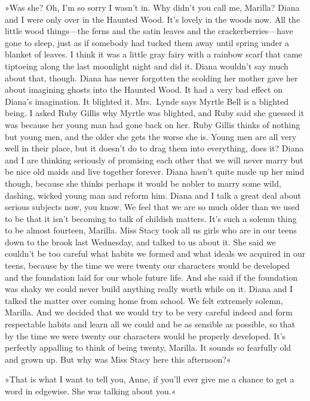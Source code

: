 »Was she? Oh, I'm so sorry I wasn't in. Why didn't you call me, Marilla? Diana and I were only over in the Haunted Wood. It's lovely in the woods now. All the little wood things—the ferns and the satin leaves and the crackerberries—have gone to sleep, just as if somebody had tucked them away until spring under a blanket of leaves. I think it was a little gray fairy with a rainbow scarf that came tiptoeing along the last moonlight night and did it. Diana wouldn't say much about that, though. Diana has never forgotten the scolding her mother gave her about imagining ghosts into the Haunted Wood. It had a very bad effect on Diana's imagination. It blighted it. Mrs.~Lynde says Myrtle Bell is a blighted being. I asked Ruby Gillis why Myrtle was blighted, and Ruby said she guessed it was because her young man had gone back on her. Ruby Gillis thinks of nothing but young men, and the older she gets the worse she is. Young men are all very well in their place, but it doesn't do to drag them into everything, does it? Diana and I are thinking seriously of promising each other that we will never marry but be nice old maids and live together forever. Diana hasn't quite made up her mind though, because she thinks perhaps it would be nobler to marry some wild, dashing, wicked young man and reform him. Diana and I talk a great deal about serious subjects now, you know. We feel that we are so much older than we used to be that it isn't becoming to talk of childish matters. It's such a solemn thing to be almost fourteen, Marilla. Miss Stacy took all us girls who are in our teens down to the brook last Wednesday, and talked to us about it. She said we couldn't be too careful what habits we formed and what ideals we acquired in our teens, because by the time we were twenty our characters would be developed and the foundation laid for our whole future life. And she said if the foundation was shaky we could never build anything really worth while on it. Diana and I talked the matter over coming home from school. We felt extremely solemn, Marilla. And we decided that we would try to be very careful indeed and form respectable habits and learn all we could and be as sensible as possible, so that by the time we were twenty our characters would be properly developed. It's perfectly appalling to think of being twenty, Marilla. It sounds so fearfully old and grown up. But why was Miss Stacy here this afternoon?«

»That is what I want to tell you, Anne, if you'll ever give me a chance to get a word in edgewise. She was talking about you.«

